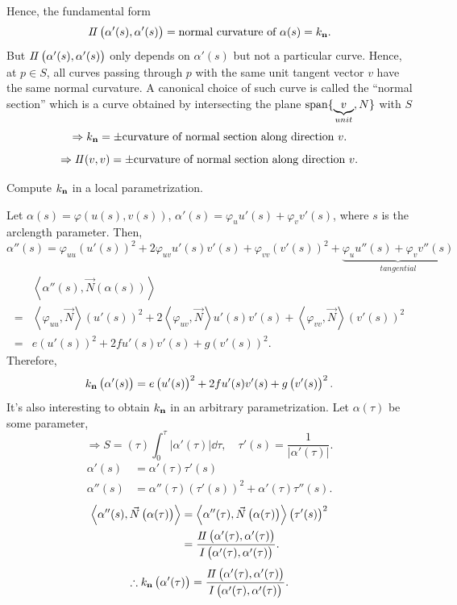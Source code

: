 Hence, the  fundamental form
\[
    I\!I\left(\alpha'(s),\alpha'(s)\right)    
    =\text{normal curvature of }\alpha(s)=k_{\vb{n}}.
\]
But \(I\!I\left(\alpha'(s),\alpha'(s)\right)\) only depends on 
\(\alpha'(s)\) but not a particular curve. Hence, at \(p\in S\), 
all curves passing through \(p\) with the same unit tangent vector
\(v\) have the same normal curvature. A canonical choice of
such curve is called the ``normal section'' which is a curve 
obtained by intersecting the plane \(\operatorname{span}\{\underbrace{v}_{unit},N\}\)
with \(S\)
\[
    \Rightarrow k_{\vb{n}}=\pm \text{curvature of normal section along
    direction }v.
\]
\[
    \Rightarrow I\!I(v,v)= \pm \text{curvature of normal section along
    direction }v.   
\]
\begin{exercise}
    Compute \(k_{\vb{n}}\) in a local parametrization.

    Let \(\alpha(s)=\varphi\left(u(s),v(s)\right)\), 
    \(\alpha'(s)=\varphi_u u'(s)+\varphi_v v'(s)\), where \(s\)
    is the arclength parameter. Then, 
    \[
        \alpha''(s)=\varphi_{uu}\left(u'(s)\right)^2 +2\varphi_{uv}
        u'(s)v'(s)+\varphi_{vv}\left(v'(s)\right)^2
        +\underbrace{\varphi_u u''(s)+\varphi_v v''(s)}_{tangential}
    \]
    \begin{align*}
        &\left\langle \alpha''(s),
        \vec{N}\left(\alpha(s)\right)\right\rangle\\
        =&\left\langle \varphi_{uu},\vec{N}\right\rangle
        \left(u'(s)\right)^2 +2\left\langle\varphi_{uv},
        \vec{N}\right\rangle u'(s)v'(s)+\left\langle
        \varphi_{vv},\vec{N}\right\rangle\left(v'(s)\right)^2\\
        =&e \left(u'(s)\right)^2+2fu'(s)v'(s)+g\left(v'(s)\right)^2
    .\end{align*}
    Therefore, 
    \[
        k_{\vb{n}}\left(\alpha'(s)\right)=
        e \left(u'(s)\right)^2+2fu'(s)v'(s)+g\left(v'(s)\right)^2.
    \]
    It's also interesting to obtain \(k_{\vb{n}}\) in an 
    arbitrary parametrization. Let \(\alpha(\tau)\) be some parameter,
    \[
        \Rightarrow
        S=\left(\tau\right)    \int_0^\tau \left|\alpha'(\tau)\right|
        \dd \tau
        ,\quad \tau'(s)=\frac{1}{\left|\alpha'(\tau)\right|}.
    \]
    \begin{align*}
        \alpha'(s)&=\alpha'(\tau)\tau'(s)\\
        \alpha''(s)&=\alpha''(\tau)\left(\tau'(s)\right)^2+
        \alpha'(\tau)\tau''(s).
    \end{align*}
    \begin{align*}
        \left\langle\alpha''(s),\vec{N}\left(\alpha(\tau)\right)
        \right\rangle
        &=\left\langle\alpha''(\tau),\vec{N}\left(\alpha(\tau)\right)
        \right\rangle\left(\tau'(s)\right)^2\\
        &=\frac{I\!I\left(\alpha'(\tau),\alpha'(\tau)\right)}{
            I\left(\alpha'(\tau),\alpha'(\tau)\right)
        }.
    \end{align*}
    \[
        \therefore   k_{\vb{n}}\left(\alpha'(\tau)\right)
        =\frac{I\!I\left(\alpha'(\tau),\alpha'(\tau)\right)}{
            I\left(\alpha'(\tau),\alpha'(\tau)\right)
        }.
    \]
\end{exercise}
